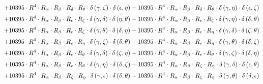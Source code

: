 \begin{subequations}
\begin{gather}
 \\[0.2em] \notag 		 + 10395 \cdot R^{4} \cdot R_{\alpha{}} \cdot R_{\beta{}} \cdot R_{\delta{}} \cdot R_{\theta{}} \cdot \delta{}\left(\gamma{}, \zeta{}\right) \cdot \delta{}\left(\epsilon{}, \eta{}\right)+ 10395 \cdot R^{4} \cdot R_{\alpha{}} \cdot R_{\beta{}} \cdot R_{\delta{}} \cdot R_{\theta{}} \cdot \delta{}\left(\gamma{}, \eta{}\right) \cdot \delta{}\left(\epsilon{}, \zeta{}\right) 
 \\[0.2em] \notag 		 + 10395 \cdot R^{4} \cdot R_{\alpha{}} \cdot R_{\beta{}} \cdot R_{\epsilon{}} \cdot R_{\zeta{}} \cdot \delta{}\left(\gamma{}, \delta{}\right) \cdot \delta{}\left(\eta{}, \theta{}\right)+ 10395 \cdot R^{4} \cdot R_{\alpha{}} \cdot R_{\beta{}} \cdot R_{\epsilon{}} \cdot R_{\zeta{}} \cdot \delta{}\left(\gamma{}, \eta{}\right) \cdot \delta{}\left(\delta{}, \theta{}\right) 
 \\[0.2em] \notag 		 + 10395 \cdot R^{4} \cdot R_{\alpha{}} \cdot R_{\beta{}} \cdot R_{\epsilon{}} \cdot R_{\zeta{}} \cdot \delta{}\left(\gamma{}, \theta{}\right) \cdot \delta{}\left(\delta{}, \eta{}\right)+ 10395 \cdot R^{4} \cdot R_{\alpha{}} \cdot R_{\beta{}} \cdot R_{\epsilon{}} \cdot R_{\eta{}} \cdot \delta{}\left(\gamma{}, \delta{}\right) \cdot \delta{}\left(\zeta{}, \theta{}\right) 
 \\[0.2em] \notag 		 + 10395 \cdot R^{4} \cdot R_{\alpha{}} \cdot R_{\beta{}} \cdot R_{\epsilon{}} \cdot R_{\eta{}} \cdot \delta{}\left(\gamma{}, \zeta{}\right) \cdot \delta{}\left(\delta{}, \theta{}\right)+ 10395 \cdot R^{4} \cdot R_{\alpha{}} \cdot R_{\beta{}} \cdot R_{\epsilon{}} \cdot R_{\eta{}} \cdot \delta{}\left(\gamma{}, \theta{}\right) \cdot \delta{}\left(\delta{}, \zeta{}\right) 
 \\[0.2em] \notag 		 + 10395 \cdot R^{4} \cdot R_{\alpha{}} \cdot R_{\beta{}} \cdot R_{\epsilon{}} \cdot R_{\theta{}} \cdot \delta{}\left(\gamma{}, \delta{}\right) \cdot \delta{}\left(\zeta{}, \eta{}\right)+ 10395 \cdot R^{4} \cdot R_{\alpha{}} \cdot R_{\beta{}} \cdot R_{\epsilon{}} \cdot R_{\theta{}} \cdot \delta{}\left(\gamma{}, \zeta{}\right) \cdot \delta{}\left(\delta{}, \eta{}\right) 
 \\[0.2em] \notag 		 + 10395 \cdot R^{4} \cdot R_{\alpha{}} \cdot R_{\beta{}} \cdot R_{\epsilon{}} \cdot R_{\theta{}} \cdot \delta{}\left(\gamma{}, \eta{}\right) \cdot \delta{}\left(\delta{}, \zeta{}\right)+ 10395 \cdot R^{4} \cdot R_{\alpha{}} \cdot R_{\beta{}} \cdot R_{\zeta{}} \cdot R_{\eta{}} \cdot \delta{}\left(\gamma{}, \delta{}\right) \cdot \delta{}\left(\epsilon{}, \theta{}\right) 
 \\[0.2em] \notag 		 + 10395 \cdot R^{4} \cdot R_{\alpha{}} \cdot R_{\beta{}} \cdot R_{\zeta{}} \cdot R_{\eta{}} \cdot \delta{}\left(\gamma{}, \epsilon{}\right) \cdot \delta{}\left(\delta{}, \theta{}\right)+ 10395 \cdot R^{4} \cdot R_{\alpha{}} \cdot R_{\beta{}} \cdot R_{\zeta{}} \cdot R_{\eta{}} \cdot \delta{}\left(\gamma{}, \theta{}\right) \cdot \delta{}\left(\delta{}, \epsilon{}\right) 

\end{gather}
\end{subequations}
